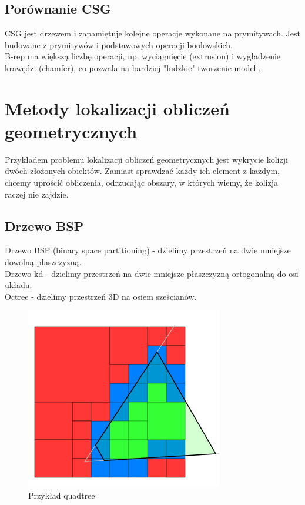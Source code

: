 \documentclass[12pt]{article}
\begin{document}
\subsection{Porównanie CSG}
CSG jest drzewem i zapamiętuje kolejne operacje wykonane na prymitywach. Jest budowane z prymitywów i podstawowych operacji boolowskich.\\
B-rep ma większą liczbę operacji, np. wyciągnięcie (extrusion) i wygładzenie krawędzi (chamfer), co pozwala na bardziej "ludzkie" tworzenie modeli.

\section{Metody lokalizacji obliczeń geometrycznych}
Przykładem problemu lokalizacji obliczeń geometrycznych jest wykrycie kolizji dwóch złożonych obiektów. Zamiast sprawdzać każdy ich element z każdym, chcemy uprościć obliczenia, odrzucając obszary, w których wiemy, że kolizja raczej nie zajdzie.

\subsection{Drzewo BSP}
Drzewo BSP (binary space partitioning) - dzielimy przestrzeń na dwie mniejsze dowolną płaszczyzną.\\
Drzewo kd - dzielimy przestrzeń na dwie mniejsze płaszczyzną ortogonalną do osi układu.\\
Octree - dzielimy przestrzeń 3D na osiem sześcianów.\\

\begin{figure}[h!]
	\centering
	\includegraphics[scale=0.5]{Pictures/octree}
	\caption{Przykład quadtree}
\end{figure}
\end{document}
